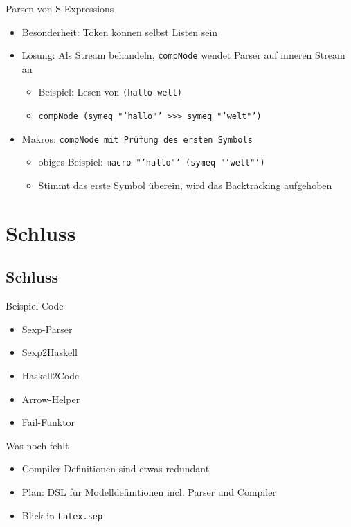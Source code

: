 \documentclass{beamer}
\begin{document}
\begin{frame}{Parsen von S-Expressions}
  \begin{itemize}
  \item Besonderheit: Token können selbst Listen sein
  \item Lösung: Als Stream behandeln, \texttt{compNode} wendet Parser
    auf inneren Stream an
    \begin{itemize}
    \item Beispiel: Lesen von \texttt{(hallo welt)}
    \item \texttt{compNode (symeq "'hallo"' >>> symeq "'welt"') } %
    \end{itemize}
  \item Makros: \texttt{compNode mit Prüfung des ersten Symbols}
    \begin{itemize}
    \item obiges Beispiel: \texttt{macro "'hallo"' (symeq "'welt"')}
    \item Stimmt das erste Symbol überein, wird das Backtracking aufgehoben
    \end{itemize}
  \end{itemize}
\end{frame}

\section{Schluss}
\subsection{Schluss}

\begin{frame}{Beispiel-Code}
  \begin{itemize}
  \item Sexp-Parser
  \item Sexp2Haskell
  \item Haskell2Code
  \item Arrow-Helper
  \item Fail-Funktor
  \end{itemize}
\end{frame}

\begin{frame}{Was noch fehlt}
  \begin{itemize}
  \item Compiler-Definitionen sind etwas redundant
  \item Plan: DSL für Modelldefinitionen incl. Parser und Compiler
  \item Blick in \texttt{Latex.sep}
  \end{itemize}
\end{frame}
\end{document}
